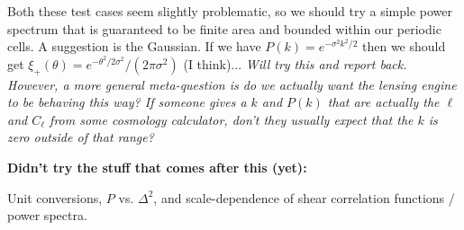 \documentclass[preprint]{aastex}
\begin{document}
Both these test cases seem slightly problematic, so we should try a simple
power spectrum that is guaranteed to be finite area and bounded within
our periodic cells.  A suggestion is the Gaussian.  If we have $P(k) =
e^{-\sigma^2 k^2 / 2}$ then we should get $\xi_+(\theta) =
e^{-\theta^2/2\sigma^2}/(2 \pi \sigma^2)$ (I think)...
{\em Will try this and report back.  However, a more general
  meta-question is do we actually want the lensing engine to be
  behaving this way?  If someone gives a $k$ and $P(k)$ that are
  actually the $\ell$ and $C_\ell$ from some cosmology calculator,
  don't they usually expect that the $k$ is zero outside of that
  range?}

\textbf{Didn't try the stuff that comes after this (yet):}

Unit conversions, $P$ vs. $\Delta^2$, and scale-dependence of shear
correlation functions / power spectra.
\end{document}
